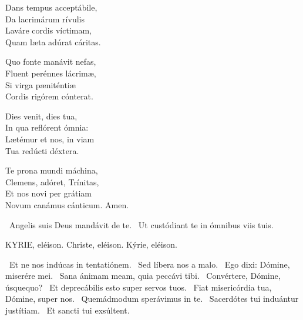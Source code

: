 Dans tempus acceptábile,\\
Da lacrimárum rívulis\\
Laváre cordis víctimam,\\
Quam læta adúrat cáritas.

Quo fonte manávit nefas,\\
Fluent perénnes lácrimæ,\\
Si virga pæniténtiæ\\
Cordis rigórem cónterat.

Dies venit, dies tua,\\
In qua reflórent ómnia:\\
Lætémur et nos, in viam\\
Tua redúcti déxtera.

Te prona mundi máchina,\\
Clemens, adóret, Trínitas,\\
Et nos novi per grátiam\\
Novum canámus cánticum. Amen.

\V\ Angelis suis Deus mandávit de te. \R\ Ut custódiant te in ómnibus viis tuis.




KYRIE, eléison. Christe, eléison. Kýrie, eléison.

 \V\ Et ne nos indúcas in tentatiónem. \R\ Sed líbera nos a malo. \V\ Ego dixi: Dómine, miserére mei. \R\ Sana ánimam meam, quia peccávi tibi. \V\ Convértere, Dómine, úsquequo? \R\ Et deprecábilis esto super servos tuos. \V\ Fiat misericórdia tua, Dómine, super nos. \R\ Quemádmodum sperávimus in te. \V\ Sacerdótes tui induántur justítiam. \R\ Et sancti tui exsúltent.


